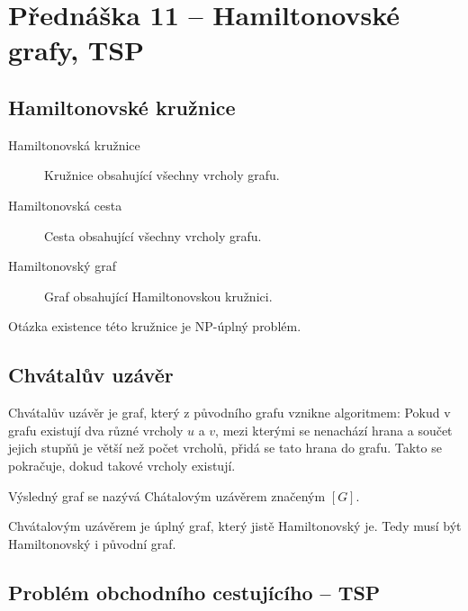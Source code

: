 \section{Přednáška 11 -- Hamiltonovské grafy, TSP}

\subsection{Hamiltonovské kružnice}

\begin{description}
    \item[Hamiltonovská kružnice] Kružnice obsahující všechny vrcholy grafu.
    \item[Hamiltonovská cesta] Cesta obsahující všechny vrcholy grafu.
    \item[Hamiltonovský graf] Graf obsahující Hamiltonovskou kružnici.
\end{description}

Otázka existence této kružnice je NP-úplný problém.

\subsection{Chvátalův uzávěr}\label{alg:chvataluv-uzaver}


Chvátalův uzávěr je graf, který z původního grafu vznikne algoritmem:
Pokud v grafu existují dva různé vrcholy $u$ a $v$, mezi kterými se nenachází hrana a součet jejich stupňů je větší než počet vrcholů, přidá se tato hrana do grafu.
Takto se pokračuje, dokud takové vrcholy existují.

Výsledný graf se nazývá Chátalovým uzávěrem značeným $[G]$.



Chvátalovým uzávěrem je úplný graf, který jistě Hamiltonovský je.
Tedy musí být Hamiltonovský i původní graf.


\subsection{Problém obchodního cestujícího -- TSP}

